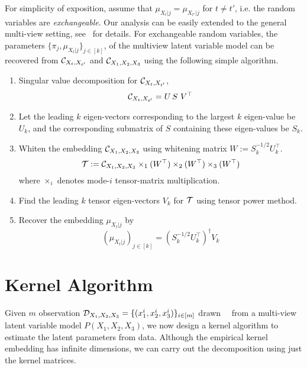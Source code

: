\documentclass[11pt]{article}
\begin{document}
For simplicity of exposition, assume that $\mu_{X_t|j} = \mu_{X_{t'}|j}$ for $t\neq t'$, i.e. the random variables are {\em exchangeable}. Our analysis can be easily extended to the general multi-view setting, see \, \cite{AnandkumarEtal:tensor12} for details. For exchangeable random variables,  the parameters $\{\pi_j, \mu_{X_t|j}\}_{j \in [k]}$, of the multiview latent variable model can be recovered from $\mathcal{C}_{X_t,X_{t'}}$ and $\mathcal{C}_{X_1,X_2,X_3}$ using the following simple algorithm.
\begin{enumerate}
  \item Singular value decomposition for $\mathcal{C}_{X_t,X_{t'}}$,
    $$\mathcal{C}_{X_t,X_{t'}} = U\, S\,\, V^\top$$
  \item Let the leading $k$ eigen-vectors corresponding to the largest $k$ eigen-value be $U_k$, and the corresponding submatrix of $S$ containing these eigen-values be $S_k$.
  \item Whiten the embedding $\mathcal{C}_{X_1,X_2,X_3}$ using whitening matrix $W:=S_k^{-1/2}U_k^\top$.
    $${\mathcal{T}} := \mathcal{C}_{X_1,X_2,X_3} \times_1 (W^\top) \times_2 (W^\top) \times_3 (W^\top)$$
    where $\times_i$ denotes mode-$i$ tensor-matrix multiplication.
  \item Find the leading $k$ tensor eigen-vectors $V_k$ for ${\mathcal{T}}$ using tensor power method.
  \item Recover the embedding $\mu_{X_t|j}$ by
    $$ (\mu_{X_t|j})_{j \in [k]}  = (S_k^{-1/2}U_k^\top)^\dagger V_k $$
\end{enumerate}

\section{Kernel Algorithm}

Given $m$ observation $\mathcal{D}_{X_1,X_2,X_3}=\{(x_1^i,x_2^i,x_3^i)\}_{i \in [m]}$ drawn \, \iid \, from a multi-view latent variable model $P(X_1,X_2,X_3)$, we now design a kernel algorithm to estimate the latent parameters from data. Although the empirical kernel embedding has infinite dimensions, we can carry out the decomposition using just the kernel matrices.
\end{document}
